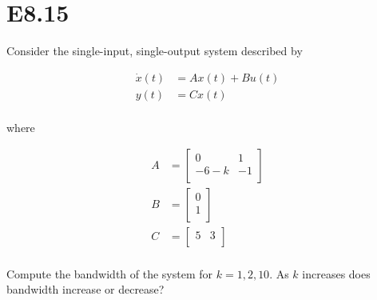 \documentclass[11pt]{article}
\begin{document}
\section{E8.15}

Consider the single-input, single-output system described by

\begin{align*}
    \dot x(t) &= Ax(t) + Bu(t) \\
    y(t) &= Cx(t) \\
\end{align*}

where 

\begin{align*}
    A &= \begin{bmatrix}
        0 & 1 \\
        -6 - k & -1 \\
    \end{bmatrix} \\
    B &= \begin{bmatrix}
        0 \\
        1 \\
    \end{bmatrix} \\
    C &= \begin{bmatrix}
        5 & 3 \\
    \end{bmatrix} \\
\end{align*}

Compute the bandwidth of the system for $k = 1, 2, 10$. As $k$ increases does bandwidth increase or decrease?
\end{document}
